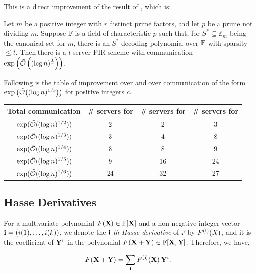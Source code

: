 This is a direct improvement of the result of \cite{efr09}, which is:

\begin{blackbox}
    \begin{theorem}
        Let $m$ be a positive integer with $r$ distinct prime factors, and let $p$ be a prime not dividing $m$.
Suppose $\mathbb{F}$ is a field of characteristic $p$ such that, for $S^* \subseteq \mathbb{Z}_m$ being the canonical set for $m$, there is an $S^*$-decoding polynomial over $\mathbb{F}$ with sparsity $\leq t$.
Then there is a $t$-server PIR scheme with communication $\exp\left(\tilde{\mathcal{O}}\left((\log n)^{\frac{1}{r}}\right)\right)$.
    \end{theorem}
\end{blackbox}


Following is the table of improvement over \cite{efr09} and \cite{dvir-gopi} over communication of the form $\exp\left(\tilde{\mathcal{O}}\!\left((\log n)^{1/c}\right)\right)$ for positive integers $c$. 

\begin{table}[h]
\centering
\begin{tabular}{|c|c|c|c|}
\hline
Total communication & \# servers for \cite{improved-pir} & \# servers for \cite{dvir-gopi} & \# servers for \cite{efr09} \\
\hline
$\exp(\tilde{\mathcal{O}}((\log n)^{1/2}))$ & 2   & 2   & 3   \\
$\exp(\tilde{\mathcal{O}}((\log n)^{1/3}))$ & 3   & 4   & 8   \\
$\exp(\tilde{\mathcal{O}}((\log n)^{1/4}))$ & 8   & 8   & 9   \\
$\exp(\tilde{\mathcal{O}}((\log n)^{1/5}))$ & 9   & 16  & 24  \\
$\exp(\tilde{\mathcal{O}}((\log n)^{1/6}))$ & 24  & 32  & 27  \\
\hline
\end{tabular}
\end{table}

\subsection*{Hasse Derivatives}
    \begin{definition}
        For a multivariate polynomial $F(\mathbf{X}) \in \mathbb{F}[\mathbf{X}]$ and a non-negative integer vector $\mathbf{i} = (i{(1)}, \ldots, i{(k)})$, we denote the \emph{$\mathbf{i}$-th Hasse derivative} of $F$ by $F^{(\mathbf{i})}(X)$, and it is the coefficient of $\mathbf{Y}^{\mathbf{i}}$ in the polynomial $F(\mathbf{X} + \mathbf{Y}) \in \mathbb{F}[\mathbf{X}, \mathbf{Y}]$. Therefore, we have,

\[F(\mathbf{X} + \mathbf{Y}) = \sum_{\mathbf{i}} F^{(\mathbf{i})}(\mathbf{X})\, \mathbf{Y}^{\mathbf{i}}.\]
    \end{definition}

